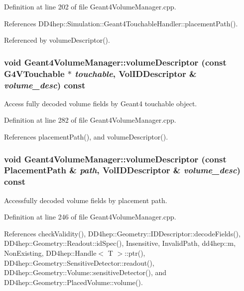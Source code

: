 Definition at line 202 of file Geant4VolumeManager.cpp.

References DD4hep::Simulation::Geant4TouchableHandler::placementPath().

Referenced by volumeDescriptor().\hypertarget{class_d_d4hep_1_1_simulation_1_1_geant4_volume_manager_a4ca06c3888aa4309011774646e73e925}{
\subsubsection[{volumeDescriptor}]{\setlength{\rightskip}{0pt plus 5cm}void Geant4VolumeManager::volumeDescriptor (const G4VTouchable $\ast$ {\em touchable}, \/  {\bf VolIDDescriptor} \& {\em volume\_\-desc}) const}}
\label{class_d_d4hep_1_1_simulation_1_1_geant4_volume_manager_a4ca06c3888aa4309011774646e73e925}


Access fully decoded volume fields by Geant4 touchable object. 

Definition at line 282 of file Geant4VolumeManager.cpp.

References placementPath(), and volumeDescriptor().\hypertarget{class_d_d4hep_1_1_simulation_1_1_geant4_volume_manager_a7c95acc49bf21e766f289e8a9ebe6887}{
\subsubsection[{volumeDescriptor}]{\setlength{\rightskip}{0pt plus 5cm}void Geant4VolumeManager::volumeDescriptor (const {\bf PlacementPath} \& {\em path}, \/  {\bf VolIDDescriptor} \& {\em volume\_\-desc}) const}}
\label{class_d_d4hep_1_1_simulation_1_1_geant4_volume_manager_a7c95acc49bf21e766f289e8a9ebe6887}


Accessfully decoded volume fields by placement path. 

Definition at line 246 of file Geant4VolumeManager.cpp.

References checkValidity(), DD4hep::Geometry::IDDescriptor::decodeFields(), DD4hep::Geometry::Readout::idSpec(), Insensitive, InvalidPath, dd4hep::m, NonExisting, DD4hep::Handle$<$ T $>$::ptr(), DD4hep::Geometry::SensitiveDetector::readout(), DD4hep::Geometry::Volume::sensitiveDetector(), and DD4hep::Geometry::PlacedVolume::volume().

